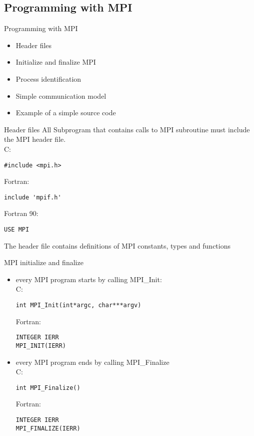 \documentclass[aspectratio=43]{beamer}
\begin{document}
\subsection{Programming with MPI}
\begin{frame}{Programming with MPI}
\begin{itemize}
\item Header files
\item Initialize and finalize MPI
\item Process identification
\item Simple communication model
\item Example of a simple source code
\end{itemize}
\end{frame}

\begin{frame}[fragile]{Header files}
All Subprogram that contains calls to MPI subroutine must include the MPI header file.\\
        C:
        \begin{verbatim}
#include <mpi.h>
        \end{verbatim}
\vspace{-0.5cm}
        Fortran:
        \begin{verbatim}
include 'mpif.h'
        \end{verbatim}
\vspace{-0.5cm}
        Fortran 90:
        \begin{verbatim}
USE MPI
        \end{verbatim}
\vspace{-0.5cm}
The header file contains definitions of MPI constants, types and functions
\end{frame}


\begin{frame}[fragile]{MPI initialize and finalize}
\begin{itemize}
    \item every MPI program starts by calling MPI\_Init:\\
        C:
        \begin{verbatim}
int MPI_Init(int*argc, char***argv)
        \end{verbatim}
\vspace{-0.5cm}
        Fortran:
        \begin{verbatim}
INTEGER IERR
MPI_INIT(IERR)
        \end{verbatim}
    \item every MPI program ends by calling MPI\_Finalize\\
        C:
        \begin{verbatim}
int MPI_Finalize()
        \end{verbatim}
\vspace{-0.5cm}
        Fortran:
        \begin{verbatim}
INTEGER IERR
MPI_FINALIZE(IERR)
        \end{verbatim}
\end{itemize}
\end{frame}
\end{document}
